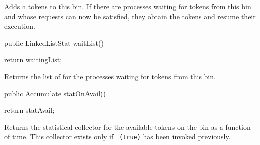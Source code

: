  \begin{tabb}  Adds \texttt{n} tokens to this bin.
  If there are processes waiting for tokens from this bin and
  whose requests can now be satisfied, they obtain the tokens and
  resume their execution.
 \end{tabb}
\begin{htmlonly}
\end{htmlonly}
\begin{code}

   public LinkedListStat waitList() \begin{hide} {
      return waitingList;
   }\end{hide}
\end{code}
 \begin{tabb}  Returns the list of 
   for the processes waiting for tokens from this bin.
 \end{tabb}
\begin{htmlonly}
\end{htmlonly}
\begin{code}

   public Accumulate statOnAvail() \begin{hide} {
      return statAvail;
   }\end{hide}
\end{code}
 \begin{tabb}  Returns the statistical collector for the available tokens
  on the bin as a function of time.
  This collector exists only if ~\texttt{(true)}
  has been invoked previously.
 \end{tabb}
\begin{htmlonly}
\end{htmlonly}
